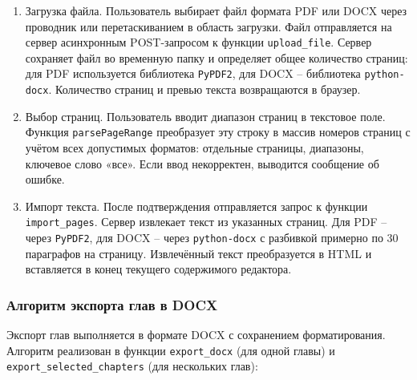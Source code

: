\begin{enumerate}
    \item Загрузка файла. Пользователь выбирает файл формата PDF или DOCX через проводник или перетаскиванием в область загрузки. Файл отправляется на сервер асинхронным POST-запросом к функции \texttt{upload\_file}. Сервер сохраняет файл во временную папку и определяет общее количество страниц: для PDF используется библиотека \texttt{PyPDF2}, для DOCX -- библиотека \texttt{python-docx}. Количество страниц и превью текста возвращаются в браузер.
    
    \item Выбор страниц. Пользователь вводит диапазон страниц в текстовое поле. Функция \texttt{parsePageRange} преобразует эту строку в массив номеров страниц с учётом всех допустимых форматов: отдельные страницы, диапазоны, ключевое слово «все». Если ввод некорректен, выводится сообщение об ошибке.
    
    \item Импорт текста. После подтверждения отправляется запрос к функции \texttt{import\_pages}. Сервер извлекает текст из указанных страниц. Для PDF -- через \texttt{PyPDF2}, для DOCX -- через \texttt{python-docx} с разбивкой примерно по 30 параграфов на страницу. Извлечённый текст преобразуется в HTML и вставляется в конец текущего содержимого редактора.
\end{enumerate}

\subsubsection{Алгоритм экспорта глав в DOCX}

Экспорт глав выполняется в формате DOCX с сохранением форматирования. Алгоритм реализован в функции \texttt{export\_docx} (для одной главы) и \texttt{export\_selected\_chapters} (для нескольких глав):

